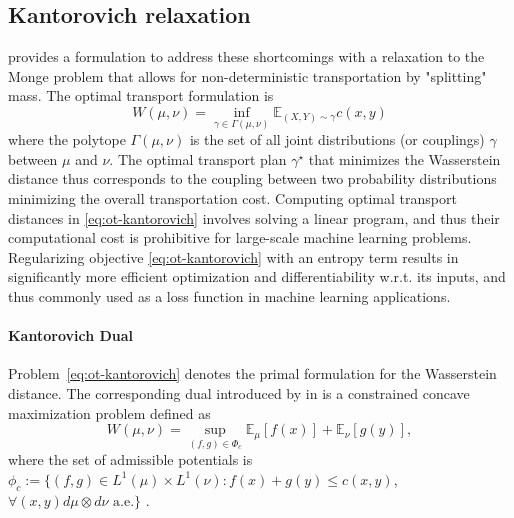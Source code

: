 \subsection{Kantorovich relaxation}  %
\citet{kantorovich1942transfer} provides a formulation to address these shortcomings with a relaxation to the
Monge problem that allows for non-deterministic transportation by "splitting" mass.
The \citet{kantorovich1942transfer} optimal transport formulation is 
\begin{equation}\label{eq:ot-kantorovich}
W(\mu, \nu)= \inf _{\gamma \in \Gamma(\mu, \nu)} \mathbb{E}_{(X, Y) \sim \gamma}c(x, y)
\end{equation}
where the polytope $\Gamma(\mu, \nu)$ is the set of all joint distributions (or couplings) $\gamma$ between $\mu$ and $\nu$.
The optimal transport plan $\gamma^\star$ that minimizes the Wasserstein distance thus corresponds to the coupling between two probability distributions minimizing the overall transportation cost.
Computing optimal transport distances in \eqref{eq:ot-kantorovich} involves solving a linear program,
and thus their computational cost is prohibitive for large-scale machine learning problems.
Regularizing objective \eqref{eq:ot-kantorovich} with an entropy term results in significantly more efficient optimization
\citep{cuturi2013sinkhorn} and differentiability w.r.t. its inputs, and thus commonly used as a loss function in machine learning applications.


\paragraph{Kantorovich Dual}
Problem~\eqref{eq:ot-kantorovich} denotes the primal formulation for the Wasserstein distance. The corresponding dual introduced by \citeauthor{kantorovich1942transfer} in \citeyear{kantorovich1942transfer} is a constrained concave maximization problem defined as
\begin{equation} \label{eq:ot-dual}
    W(\mu, \nu)=\sup _{(f, g) \in \Phi_{c}} \mathbb{E}_{\mu}[f(x)]+\mathbb{E}_{\nu}[g(y)],
\end{equation}
where the set of admissible potentials is $\phi_c := \{(f, g) \in L^{1}(\mu) \times L^{1}(\nu): f(x)+g(y) \leq c(x, y)$, $\forall(x, y) d\mu \otimes d\nu \text{ a.e.}\}$ \citep[Theorem 1.3]{villani2021topics}.

